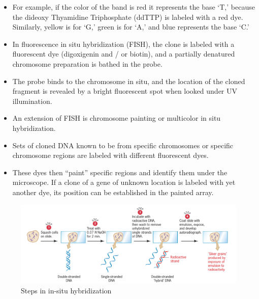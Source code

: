 \documentclass[11pt,dvipsnames,ignorenonframetext,aspectratio=169]{beamer}
\providecommand{\tightlist}{%
  \setlength{\itemsep}{0pt}\setlength{\parskip}{0pt}}
\begin{document}
\begin{frame}{}
\protect\hypertarget{section-3}{}
\begin{itemize}
\tightlist
\item
  For example, if the color of the band is red it represents the base
  `T,' because the dideoxy Thyamidine Triphosphate (ddTTP) is labeled
  with a red dye. Similarly, yellow is for `G,' green is for `A,' and
  blue represents the base `C.'
\item
  In fluorescence in situ hybridization (FISH), the clone is labeled
  with a fluorescent dye (digoxigenin and / or biotin), and a partially
  denatured chromosome preparation is bathed in the probe.
\end{itemize}
\end{frame}

\begin{frame}{}
\protect\hypertarget{section-4}{}
\begin{itemize}
\tightlist
\item
  The probe binds to the chromosome in situ, and the location of the
  cloned fragment is revealed by a bright fluorescent spot when looked
  under UV illumination.
\item
  An extension of FISH is chromosome painting or multicolor in situ
  hybridization.
\item
  Sets of cloned DNA known to be from specific chromosomes or specific
  chromosome regions are labeled with different fluorescent dyes.
\item
  These dyes then ``paint'' specific regions and identify them under the
  microscope. If a clone of a gene of unknown location is labeled with
  yet another dye, its position can be established in the painted array.
\end{itemize}
\end{frame}

\begin{frame}{}
\protect\hypertarget{section-5}{}
\begin{figure}
\includegraphics[width=0.65\linewidth]{./../images/insitu_hybrid_steps} \caption{Steps in in-situ hybridization}\label{fig:insitu-hybridization}
\end{figure}
\end{frame}
\end{document}
